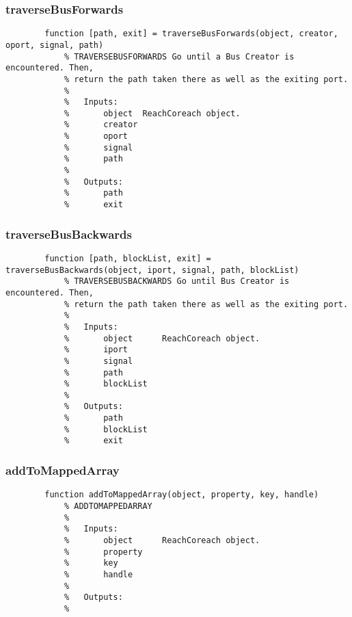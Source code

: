 \documentclass[12pt,letterpaper]{report}
\begin{document}
		\subsubsection{traverseBusForwards}
\begin{lstlisting}
        function [path, exit] = traverseBusForwards(object, creator, oport, signal, path)
            % TRAVERSEBUSFORWARDS Go until a Bus Creator is encountered. Then,
            % return the path taken there as well as the exiting port.
            %
            %   Inputs:
            %       object  ReachCoreach object.
            %       creator
            %       oport
            %       signal
            %       path
            %
            %   Outputs:
            %       path
            %       exit
\end{lstlisting}
		
		\subsubsection{traverseBusBackwards}
\begin{lstlisting}
        function [path, blockList, exit] = traverseBusBackwards(object, iport, signal, path, blockList)
            % TRAVERSEBUSBACKWARDS Go until Bus Creator is encountered. Then,
            % return the path taken there as well as the exiting port.
            %
            %   Inputs:
            %       object      ReachCoreach object.
            %       iport
            %       signal
            %       path
            %       blockList
            %
            %   Outputs:
            %       path
            %       blockList
            %       exit
\end{lstlisting}
		
		\subsubsection{addToMappedArray}
\begin{lstlisting}
        function addToMappedArray(object, property, key, handle)
            % ADDTOMAPPEDARRAY
            %
            %   Inputs:
            %       object      ReachCoreach object.
            %       property
            %       key
            %       handle
            %
            %   Outputs:
            %
\end{lstlisting}
		
\end{document}
